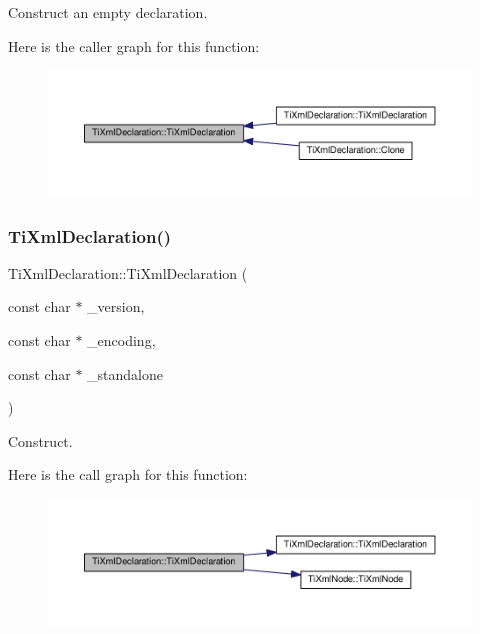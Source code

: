 Construct an empty declaration. 

Here is the caller graph for this function\+:\nopagebreak
\begin{figure}[H]
\begin{center}
\leavevmode
\includegraphics[width=350pt]{class_ti_xml_declaration_aa0484d059bea0ea1acb47c9094382d79_icgraph}
\end{center}
\end{figure}
\mbox{\label{class_ti_xml_declaration_a3b618d1c30c25e4b7a71f31a595ee298}} 
\subsubsection{\texorpdfstring{Ti\+Xml\+Declaration()}{TiXmlDeclaration()}\hspace{0.1cm}{\footnotesize\ttfamily [2/3]}}
{\footnotesize\ttfamily Ti\+Xml\+Declaration\+::\+Ti\+Xml\+Declaration (\begin{DoxyParamCaption}\item[{const char $\ast$}]{\+\_\+version,  }\item[{const char $\ast$}]{\+\_\+encoding,  }\item[{const char $\ast$}]{\+\_\+standalone }\end{DoxyParamCaption})}



Construct. 

Here is the call graph for this function\+:\nopagebreak
\begin{figure}[H]
\begin{center}
\leavevmode
\includegraphics[width=350pt]{class_ti_xml_declaration_a3b618d1c30c25e4b7a71f31a595ee298_cgraph}
\end{center}
\end{figure}
\mbox{\label{class_ti_xml_declaration_a58ac9042c342f7845c8491da0bb091e8}} 
